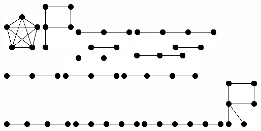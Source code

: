 \documentclass[11pt,paper=b5,footinclude,headinclude]{scrbook} %
\begin{document}
\includegraphics[scale=0.5,frame]{smallGraphs/g_K5.png}     
\includegraphics[scale=0.5,frame]{smallGraphs/g_P.png}     
\includegraphics[scale=0.5,frame]{smallGraphs/g_P2UP3.png}     
\includegraphics[scale=0.5,frame]{smallGraphs/g_P2UP4.png}     
\includegraphics[scale=0.5,frame]{smallGraphs/g_P3.png}     
\includegraphics[scale=0.5,frame]{smallGraphs/g_P3U2K1.png}     
\includegraphics[scale=0.5,frame]{smallGraphs/g_P3UP4.png}     
\includegraphics[scale=0.5,frame]{smallGraphs/g_P4.png}     
\includegraphics[scale=0.5,frame]{smallGraphs/g_P5.png}     
\includegraphics[scale=0.5,frame]{smallGraphs/g_P6.png}     
\includegraphics[scale=0.5,frame]{smallGraphs/g_R.png}     
\end{document}

